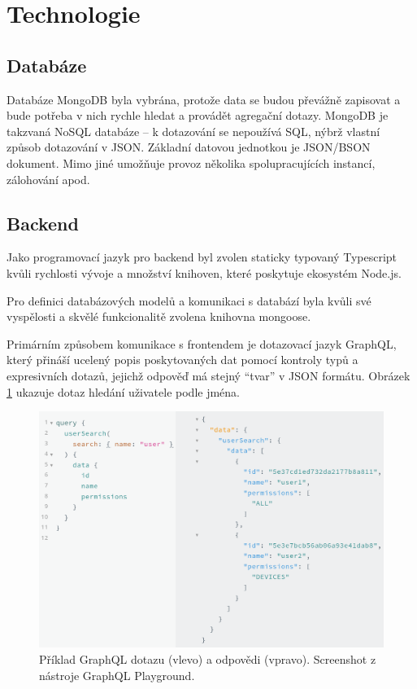 \section{Technologie}

\subsection{Databáze}

\noindent
Databáze MongoDB byla vybrána, protože data se budou převážně zapisovat a bude potřeba v nich rychle
hledat a provádět agregační dotazy.
MongoDB je takzvaná NoSQL databáze -- k dotazování se nepoužívá SQL, nýbrž vlastní způsob dotazování v
JSON. Základní datovou jednotkou je JSON/BSON dokument.
Mimo jiné umožňuje provoz několika spolupracujících instancí, zálohování apod. \citep[][]{MongoDB}

\subsection{Backend} \label{backend}

\noindent
Jako programovací jazyk pro backend byl zvolen staticky typovaný Typescript kvůli rychlosti vývoje
a množství knihoven, které poskytuje ekosystém Node.js. \citep[][]{Typescript} \citep[][]{Nodejs}

Pro definici databázových modelů a komunikaci s databází byla kvůli své vyspělosti a skvělé funkcionalitě zvolena
knihovna mongoose. \citep[][]{Mongoose}

Primárním způsobem komunikace s frontendem
je dotazovací jazyk GraphQL, který přináší ucelený popis poskytovaných dat pomocí kontroly typů a
expresivních dotazů, jejichž odpověď má stejný ``tvar'' v JSON formátu. 
Obrázek \ref{fig:graphql_example} ukazuje dotaz hledání uživatele podle jména.

\begin{figure} \centering
\includegraphics[width=145mm]{../img/graphql_example.png}
\caption{Příklad GraphQL dotazu (vlevo) a odpovědi (vpravo). Screenshot z nástroje GraphQL Playground.}
\label{fig:graphql_example}
\end{figure}

